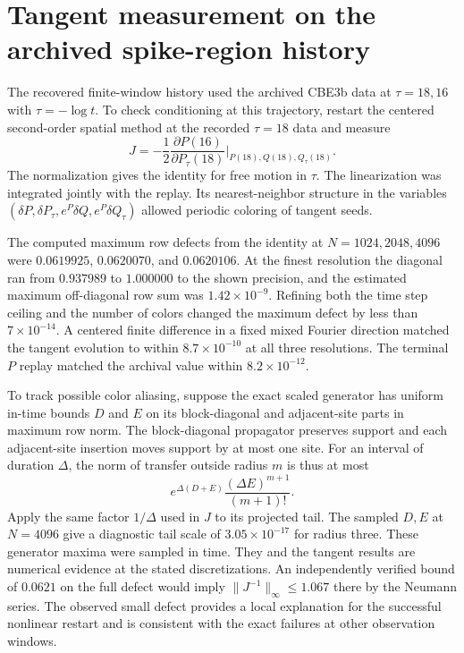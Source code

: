 \section{Tangent measurement on the archived spike-region history}
\label{sec:archive}
The recovered finite-window history used the archived
CBE3b data at $\tau=18,16$ with $\tau=-\log t$.
To check conditioning at this trajectory, restart the centered
second-order spatial method at the recorded $\tau=18$ data and
measure
\[
 J=-\frac12 \frac{\partial P(16)}{\partial P_\tau(18)}
      \bigg|_{P(18),Q(18),Q_\tau(18)} .
\]
The normalization gives the identity for free motion in $\tau$.
The linearization was integrated jointly with the replay.
Its nearest-neighbor structure in the variables
$(\delta P,\delta P_\tau,e^P\delta Q,e^P\delta Q_\tau)$
allowed periodic coloring of tangent seeds.

The computed maximum row defects from the identity at
$N=1024,2048,4096$ were $0.0619925$, $0.0620070$, and
$0.0620106$. At the finest resolution the diagonal ran
from $0.937989$ to $1.000000$ to the shown precision, and the
estimated maximum off-diagonal row sum was $1.42\times10^{-9}$.
Refining both the time step ceiling and the number of colors
changed the maximum defect by less than $7\times10^{-14}$.
A centered finite difference in a fixed mixed Fourier
direction matched the tangent evolution to within
$8.7\times10^{-10}$ at all three resolutions. The terminal
$P$ replay matched the archival value within $8.2\times10^{-12}$.

To track possible color aliasing, suppose the exact scaled
generator has uniform in-time bounds $D$ and $E$ on its
block-diagonal and adjacent-site parts in maximum row norm.
The block-diagonal propagator preserves support and each
adjacent-site insertion moves support by at most one site.
For an interval of duration $\Delta$, the norm of transfer
outside radius $m$ is thus at most
\[
 e^{\Delta(D+E)}
   \frac{(\Delta E)^{m+1}}{(m+1)!}.
\]
Apply the same factor $1/\Delta$ used in $J$ to its projected
tail. The sampled $D,E$ at $N=4096$ give a diagnostic tail
scale of $3.05\times10^{-17}$ for radius three. These
generator maxima were sampled in time. They and the tangent
results are numerical evidence at the stated discretizations.
An independently verified bound of $0.0621$ on the full defect
would imply $\|J^{-1}\|_\infty\leq 1.067$ there by the
Neumann series. The observed small defect provides a local
explanation for the successful nonlinear restart and is
consistent with the exact failures at other observation windows.
